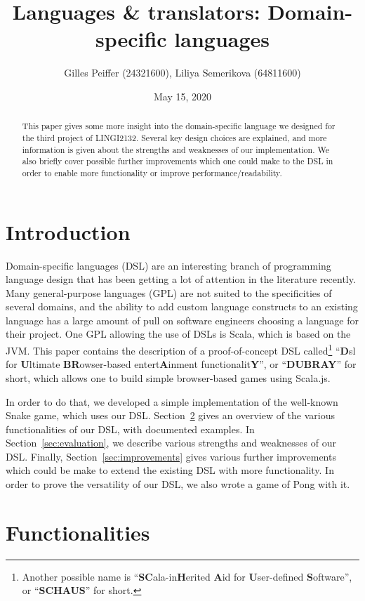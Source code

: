 \documentclass[journal,onecolumn, 9pt]{IEEEtran}
\title{Languages \& translators: Domain-specific languages}
\author{Gilles Peiffer (24321600), Liliya Semerikova (64811600)}
\date{May 15, 2020}
\theoremstyle{definition}
\begin{document}
\maketitle

\begin{abstract}
	This paper gives some more insight into the domain-specific language we designed for the third project of LINGI2132.
	Several key design choices are explained, and more information is given about the strengths and weaknesses of our implementation.
	We also briefly cover possible further improvements which one could make to the DSL in order to enable more functionality or improve performance/readability.
\end{abstract}

\section{Introduction}
Domain-specific languages (DSL) are an interesting branch of programming language design that has been getting a lot of attention in the literature recently.
Many general-purpose languages (GPL) are not suited to the specificities of several domains, and the ability to add custom language constructs to an existing language has a large amount of pull on software engineers choosing a language for their project.
One GPL allowing the use of DSLs is Scala, which is based on the JVM.
This paper contains the description of a proof-of-concept DSL called\footnote{Another possible name is ``\textbf{SC}ala-in\textbf{H}erited \textbf{A}id for \textbf{U}ser-defined \textbf{S}oftware'', or ``\textbf{SCHAUS}'' for short.} ``\textbf{D}sl for \textbf{U}ltimate \textbf{BR}owser-based entert\textbf{A}inment functionalit\textbf{Y}'', or ``\textbf{DUBRAY}'' for short, which allows one to build simple browser-based games using Scala.js.

In order to do that, we developed a simple implementation of the well-known Snake game, which uses our DSL.
Section~\ref{sec:functionalities} gives an overview of the various functionalities of our DSL, with documented examples.
In Section~\ref{sec:evaluation}, we describe various strengths and weaknesses of our DSL.
Finally, Section~\ref{sec:improvements} gives various further improvements which could be make to extend the existing DSL with more functionality.
In order to prove the versatility of our DSL, we also wrote a game of Pong with it.

\section{Functionalities}
\label{sec:functionalities}
\end{document}
